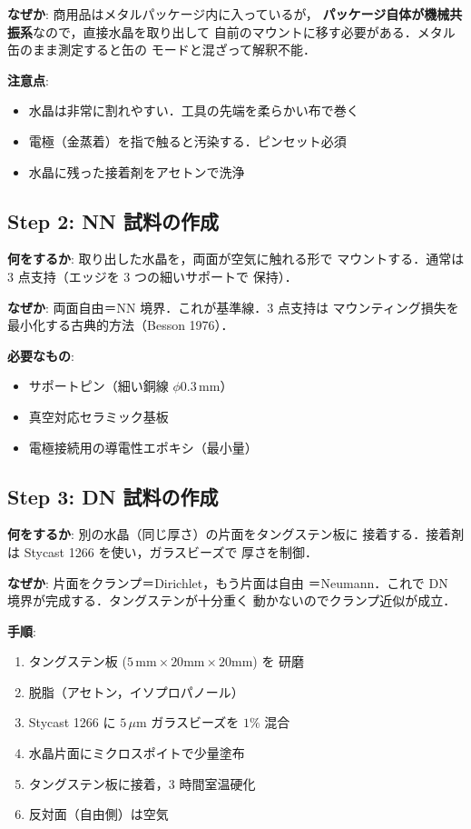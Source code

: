 \documentclass[11pt,a4paper]{article}
\begin{document}
\textbf{なぜか}: 商用品はメタルパッケージ内に入っているが，
\textbf{パッケージ自体が機械共振系}なので，直接水晶を取り出して
自前のマウントに移す必要がある．メタル缶のまま測定すると缶の
モードと混ざって解釈不能．

\textbf{注意点}:
\begin{itemize}
\item 水晶は非常に割れやすい．工具の先端を柔らかい布で巻く
\item 電極（金蒸着）を指で触ると汚染する．ピンセット必須
\item 水晶に残った接着剤をアセトンで洗浄
\end{itemize}

\subsection{Step 2: NN 試料の作成}

\textbf{何をするか}: 取り出した水晶を，両面が空気に触れる形で
マウントする．通常は 3 点支持（エッジを 3 つの細いサポートで
保持）．

\textbf{なぜか}: 両面自由＝NN 境界．これが基準線．3 点支持は
マウンティング損失を最小化する古典的方法（Besson 1976）．

\textbf{必要なもの}:
\begin{itemize}
\item サポートピン（細い銅線 $\phi 0.3$\,mm）
\item 真空対応セラミック基板
\item 電極接続用の導電性エポキシ（最小量）
\end{itemize}

\subsection{Step 3: DN 試料の作成}

\textbf{何をするか}: 別の水晶（同じ厚さ）の片面をタングステン板に
接着する．接着剤は Stycast 1266 を使い，ガラスビーズで
厚さを制御．

\textbf{なぜか}: 片面をクランプ＝Dirichlet，もう片面は自由
＝Neumann．これで DN 境界が完成する．タングステンが十分重く
動かないのでクランプ近似が成立．

\textbf{手順}:
\begin{enumerate}
\item タングステン板 ($5\,\text{mm} \times 20\text{mm} \times 20\text{mm}$) を
研磨
\item 脱脂（アセトン，イソプロパノール）
\item Stycast 1266 に $5\,\mu$m ガラスビーズを $1\%$ 混合
\item 水晶片面にミクロスポイトで少量塗布
\item タングステン板に接着，3 時間室温硬化
\item 反対面（自由側）は空気
\end{enumerate}
\end{document}
